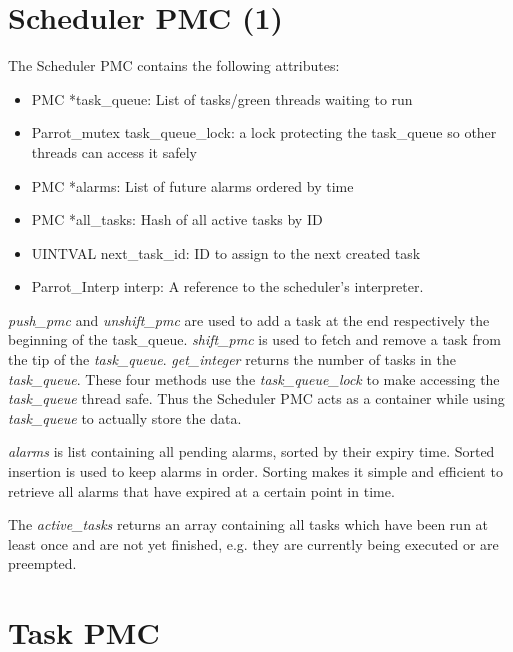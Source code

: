 \documentclass[bachelor,english]{hgbthesis}
\begin{document}
\section{Scheduler PMC (1)}

The Scheduler PMC contains the following attributes:
%
\begin{itemize}
\item PMC *task\_queue: List of tasks/green threads waiting to run
\item Parrot\_mutex task\_queue\_lock: a lock protecting the task\_queue so other threads can access it safely
\item PMC *alarms: List of future alarms ordered by time
\item PMC *all\_tasks: Hash of all active tasks by ID
\item UINTVAL next\_task\_id: ID to assign to the next created task
\item Parrot\_Interp interp: A reference to the scheduler's interpreter.
\end{itemize}

\textit{push\_pmc} and \textit{unshift\_pmc} are used to add a task at the end respectively the beginning of the task\_queue. \textit{shift\_pmc} is used to fetch and remove a task from the tip of the \textit{task\_queue}. \textit{get\_integer} returns the number of tasks in the \textit{task\_queue}. These four methods use the \textit{task\_queue\_lock} to make accessing the \textit{task\_queue} thread safe. Thus the Scheduler PMC acts as a container while using \textit{task\_queue} to actually store the data.

\textit{alarms} is list containing all pending alarms, sorted by their expiry time. Sorted insertion is used to keep alarms in order. Sorting makes it simple and efficient to retrieve all alarms that have expired at a certain point in time.

The \textit{active\_tasks} returns an array containing all tasks which have been run at least once and are not yet finished, e.g. they are currently being executed or are preempted.

\section{Task PMC}
\end{document}
